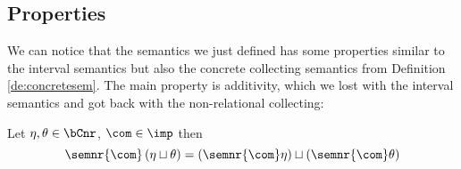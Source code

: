 \subsection{Properties}
\label{sub:nonrelprop}

We can notice that the semantics we just defined has some properties
similar to the interval semantics but also the concrete collecting
semantics from Definition \ref{de:concretesem}. The main property is
additivity, which we lost with the interval semantics and got back
with the non-relational collecting:

\begin{lemma}[Additivity]
  Let \(\eta, \theta \in \bCnr\), \(\com\in\imp\) then
  \begin{equation*}
    \semnr{\com}\left(\eta \sqcup \theta\right) = \left(\semnr{\com}\eta\right) \sqcup \left(\semnr{\com}\theta\right)
  \end{equation*}
\end{lemma}

